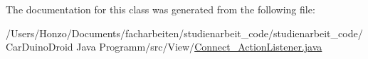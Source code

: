 The documentation for this class was generated from the following file\+:\begin{DoxyCompactItemize}
\item 
/\+Users/\+Honzo/\+Documents/facharbeiten/studienarbeit\+\_\+code/studienarbeit\+\_\+code/\+Car\+Duino\+Droid Java Programm/src/\+View/\hyperlink{_connect___action_listener_8java}{Connect\+\_\+\+Action\+Listener.\+java}\end{DoxyCompactItemize}
